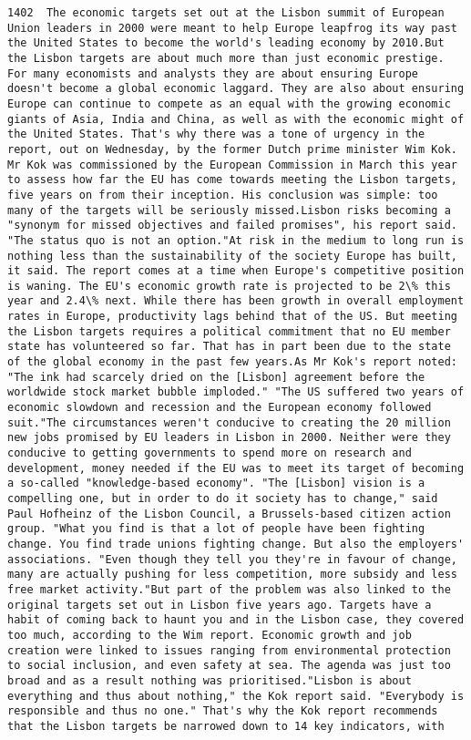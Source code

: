 \documentclass[11pt]{article}
\begin{document}
\begin{Verbatim}[commandchars=\\\{\}]
         1402  The economic targets set out at the Lisbon summit of European Union leaders in 2000 were meant to help Europe leapfrog its way past the United States to become the world's leading economy by 2010.But the Lisbon targets are about much more than just economic prestige. For many economists and analysts they are about ensuring Europe doesn't become a global economic laggard. They are also about ensuring Europe can continue to compete as an equal with the growing economic giants of Asia, India and China, as well as with the economic might of the United States. That's why there was a tone of urgency in the report, out on Wednesday, by the former Dutch prime minister Wim Kok. Mr Kok was commissioned by the European Commission in March this year to assess how far the EU has come towards meeting the Lisbon targets, five years on from their inception. His conclusion was simple: too many of the targets will be seriously missed.Lisbon risks becoming a "synonym for missed objectives and failed promises", his report said. "The status quo is not an option."At risk in the medium to long run is nothing less than the sustainability of the society Europe has built, it said. The report comes at a time when Europe's competitive position is waning. The EU's economic growth rate is projected to be 2\% this year and 2.4\% next. While there has been growth in overall employment rates in Europe, productivity lags behind that of the US. But meeting the Lisbon targets requires a political commitment that no EU member state has volunteered so far. That has in part been due to the state of the global economy in the past few years.As Mr Kok's report noted: "The ink had scarcely dried on the [Lisbon] agreement before the worldwide stock market bubble imploded." "The US suffered two years of economic slowdown and recession and the European economy followed suit."The circumstances weren't conducive to creating the 20 million new jobs promised by EU leaders in Lisbon in 2000. Neither were they conducive to getting governments to spend more on research and development, money needed if the EU was to meet its target of becoming a so-called "knowledge-based economy". "The [Lisbon] vision is a compelling one, but in order to do it society has to change," said Paul Hofheinz of the Lisbon Council, a Brussels-based citizen action group. "What you find is that a lot of people have been fighting change. You find trade unions fighting change. But also the employers' associations. "Even though they tell you they're in favour of change, many are actually pushing for less competition, more subsidy and less free market activity."But part of the problem was also linked to the original targets set out in Lisbon five years ago. Targets have a habit of coming back to haunt you and in the Lisbon case, they covered too much, according to the Wim report. Economic growth and job creation were linked to issues ranging from environmental protection to social inclusion, and even safety at sea. The agenda was just too broad and as a result nothing was prioritised."Lisbon is about everything and thus about nothing," the Kok report said. "Everybody is responsible and thus no one." That's why the Kok report recommends that the Lisbon targets be narrowed down to 14 key indicators, with 
\end{Verbatim}
\end{document}
